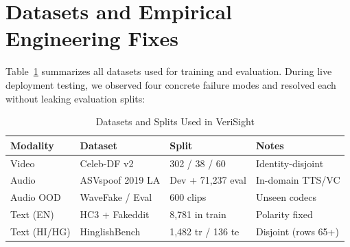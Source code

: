 \documentclass[conference]{IEEEtran}
\begin{document}
\section{Datasets and Empirical Engineering Fixes}
Table~\ref{tab:datasets} summarizes all datasets used for training and evaluation. During live deployment testing, we observed four concrete failure modes and resolved each without leaking evaluation splits:

\begin{table}[htbp]
\caption{Datasets and Splits Used in VeriSight}
\label{tab:datasets}
\centering
\begin{tabular}{@{}llll@{}}
\toprule
\textbf{Modality} & \textbf{Dataset} & \textbf{Split} & \textbf{Notes} \\
\midrule
Video & Celeb-DF v2 & 302 / 38 / 60 & Identity-disjoint \\
Audio & ASVspoof 2019 LA & Dev + 71,237 eval & In-domain TTS/VC \\
Audio OOD & WaveFake / Eval & 600 clips & Unseen codecs \\
Text (EN) & HC3 + Fakeddit & 8,781 in train & Polarity fixed \\
Text (HI/HG) & HinglishBench & 1,482 tr / 136 te & Disjoint (rows 65+) \\
\bottomrule
\end{tabular}
\end{table}
\end{document}
